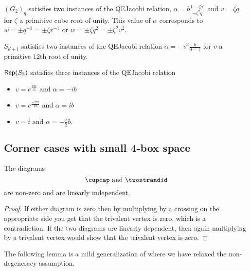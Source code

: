\documentclass[12pt]{amsart}
\begin{document}
\begin{lemma}
$(G_2)_q$ satisfies two instances of the QEJacobi relation, $\alpha = b \frac{1-\zeta q^2}{-\zeta^2 q}$ and $v = \zeta q$ for $\zeta$ a primitive cube root of unity.  This value of $\alpha$ corresponds to $w = \pm q^{-1} = \pm \zeta v^{-1}$ or $w = \pm \zeta q^2 = \pm \zeta^2 v^2$.
\end{lemma}

\begin{lemma}
$S_{d+1}$ satisfies two instances of the QEJacobi relation $\alpha = -v^3 \frac{b}{d-1}$ for $v$ a primitive $12$th root of unity.
\end{lemma}

\begin{lemma}
$\operatorname{\mathsf{Rep}}(S_3)$ satisfies three instances of the QEJacobi relation
\begin{itemize}
\item $v = e^{\frac{2 \pi i}{12}}$ and $\alpha = -i b$
\item $v = e^{\frac{-2 \pi i}{12}}$ and $\alpha = i b$
\item $v = i$ and $\alpha = -\frac{i}{2} b$.
\end{itemize}
\end{lemma}











\subsection{Corner cases with small 4-box space}

\begin{lemma}
The diagrams
$$\cupcap \text{ and } \twostrandid$$
are non-zero and are linearly independent.
\end{lemma}
\begin{proof}
If either diagram is zero then by multiplying by a crossing on the appropriate side you get that the trivalent vertex is zero, which is a contradiction.  If the two diagrams are linearly dependent, then again multiplying by a trivalent vertex would show that the trivalent vertex is zero.
\end{proof}


The following lemma is a mild generalization of  where we have relaxed the non-degeneracy assumption.
\end{document}
